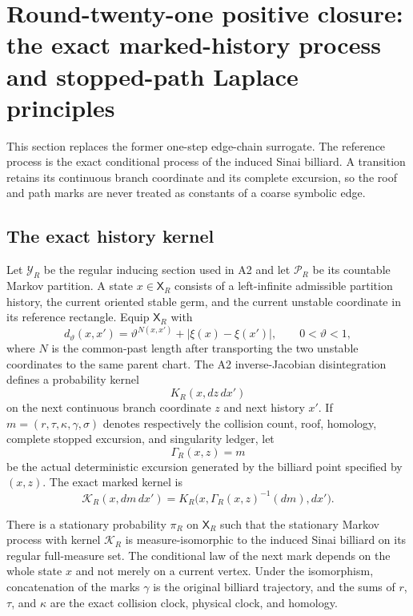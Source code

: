 \section{Round-twenty-one positive closure: the exact marked-history process and stopped-path Laplace principles}
\label{sec:r21-a3}

This section replaces the former one-step edge-chain surrogate.  The reference
process is the exact conditional process of the induced Sinai billiard.  A
transition retains its continuous branch coordinate and its complete
excursion, so the roof and path marks are never treated as constants of a
coarse symbolic edge.

\subsection{The exact history kernel}

Let $\mathscr Y_R$ be the regular inducing section used in A2 and let
$\mathscr P_R$ be its countable Markov partition.  A state
$x\in\mathsf X_R$ consists of a left-infinite admissible partition history,
the current oriented stable germ, and the current unstable coordinate in its
reference rectangle.  Equip $\mathsf X_R$ with
\[
 d_\vartheta(x,x')=\vartheta^{N(x,x')}+
 |\xi(x)-\xi(x')|,
 \qquad 0<\vartheta<1,
\]
where $N$ is the common-past length after transporting the two unstable
coordinates to the same parent chart.  The A2 inverse-Jacobian disintegration
defines a probability kernel
\[
 K_R(x,dz\,dx')
\]
on the next continuous branch coordinate $z$ and next history $x'$.  If
$m=(r,\tau,\kappa,\gamma,\sigma)$ denotes respectively the collision count,
roof, homology, complete stopped excursion, and singularity ledger, let
\[
 \Gamma_R(x,z)=m
\]
be the actual deterministic excursion generated by the billiard point
specified by $(x,z)$.  The exact marked kernel is
\[
 \mathcal K_R(x,dm\,dx')
 =K_R\bigl(x,\Gamma_R(x,z)^{-1}(dm),dx'\bigr).
\]

\begin{theorem}
\label{thm:r21-a3-history}
There is a stationary probability $\pi_R$ on $\mathsf X_R$ such that the
stationary Markov process with kernel $\mathcal K_R$ is measure-isomorphic to
the induced Sinai billiard on its regular full-measure set.  The conditional
law of the next mark depends on the whole state $x$ and not merely on a current
vertex.  Under the isomorphism, concatenation of the marks $\gamma$ is the
original billiard trajectory, and the sums of $r$, $\tau$, and $\kappa$ are
the exact collision clock, physical clock, and homology.
\end{theorem}

